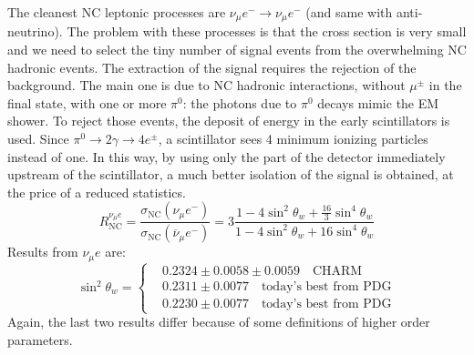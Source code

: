 \documentclass[10.75pt,a4paper,openright,bottom=2cm]{article}
\begin{document}
The cleanest NC leptonic processes are $\nu_\mu e^-\to\nu_\mu e^-$ (and same with anti-neutrino). The problem with these processes is that the cross section is very small and we need to select the tiny number of signal events from the overwhelming NC hadronic events. The extraction of the signal requires the rejection of the background. The main one is due to NC hadronic interactions, without $\mu^\pm$ in the final state, with one or more $\pi^0$: the photons due to $\pi^0$ decays mimic the EM shower. To reject those events, the deposit of energy in the early scintillators is used. Since $\pi^0\to2\gamma\to4e^\pm$, a scintillator sees 4 minimum ionizing particles instead of one. In this way, by using only the part of the detector immediately upstream of the scintillator, a much better isolation of the signal is obtained, at the price of a reduced statistics. 
\[
R_{\text{NC}}^{\nu_\mu e}=\frac{\sigma_{\text{NC}}(\nu_\mu e^-)}{\sigma_{\text{NC}}(\overline{\nu}_\mu e^-)}=3\frac{1-4\sin^2\theta_w+\frac{16}{3}\sin^4\theta_w}{1-4\sin^2\theta_w+16\sin^4\theta_w}
\]
Results from $\nu_\mu e$ are:
\[
\sin^2\theta_w=
\left\{
\begin{aligned}
&0.2324\pm0.0058\pm0.0059 \quad \text{CHARM}\\
&0.2311\pm0.0077 \quad \text{today's best from PDG}\\
&0.2230\pm0.0077 \quad \text{today's best from PDG}
\end{aligned}
\right.
\]
Again, the last two results differ because of some definitions of higher order parameters.
\end{document}
